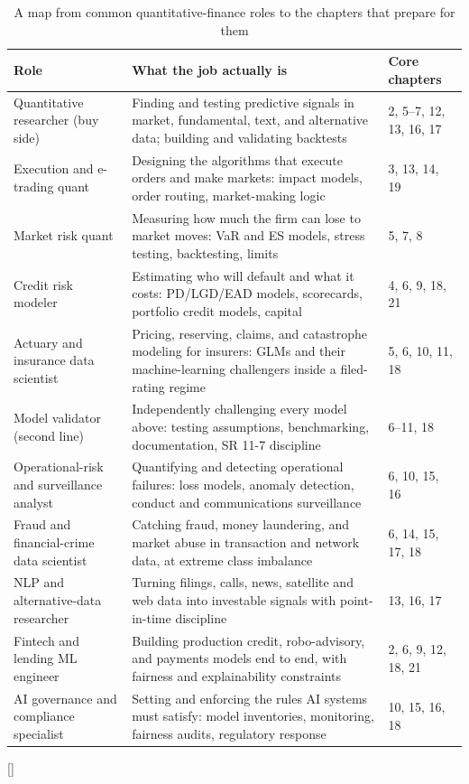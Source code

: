 \documentclass[../ai_in_finance]{subfiles}
\begin{document}
\begin{table}[htbp]
\centering
\begin{lrbox}{\bookmeasuredbox}
\begin{tabular}{L{3.4cm}L{5.6cm}L{3.4cm}}
\toprule
Role & What the job actually is & Core chapters \\
\midrule
Quantitative researcher (buy side) & Finding and testing predictive signals in market, fundamental, text, and alternative data; building and validating backtests & 2, 5--7, 12, 13, 16, 17 \\
Execution and e-trading quant & Designing the algorithms that execute orders and make markets: impact models, order routing, market-making logic & 3, 13, 14, 19 \\
Market risk quant & Measuring how much the firm can lose to market moves: VaR and ES models, stress testing, backtesting, limits & 5, 7, 8 \\
Credit risk modeler & Estimating who will default and what it costs: PD/LGD/EAD models, scorecards, portfolio credit models, capital & 4, 6, 9, 18, 21 \\
Actuary and insurance data scientist & Pricing, reserving, claims, and catastrophe modeling for insurers: GLMs and their machine-learning challengers inside a filed-rating regime & 5, 6, 10, 11, 18 \\
Model validator (second line) & Independently challenging every model above: testing assumptions, benchmarking, documentation, SR 11-7 discipline & 6--11, 18 \\
Operational-risk and surveillance analyst & Quantifying and detecting operational failures: loss models, anomaly detection, conduct and communications surveillance & 6, 10, 15, 16 \\
Fraud and financial-crime data scientist & Catching fraud, money laundering, and market abuse in transaction and network data, at extreme class imbalance & 6, 14, 15, 17, 18 \\
NLP and alternative-data researcher & Turning filings, calls, news, satellite and web data into investable signals with point-in-time discipline & 13, 16, 17 \\
Fintech and lending ML engineer & Building production credit, robo-advisory, and payments models end to end, with fairness and explainability constraints & 2, 6, 9, 12, 18, 21 \\
AI governance and compliance specialist & Setting and enforcing the rules AI systems must satisfy: model inventories, monitoring, fairness audits, regulatory response & 10, 15, 16, 18 \\
\bottomrule
\end{tabular}
\end{lrbox}
\ifdim\wd\bookmeasuredbox<0.65\linewidth
\setlength{\bookcapwidth}{0.65\linewidth}
\else
\setlength{\bookcapwidth}{\wd\bookmeasuredbox}
\fi
{}[\bookcapwidth]{
\usebox{\bookmeasuredbox}
}{
\caption{A map from common quantitative-finance roles to the chapters that prepare for them}
\label{tab:appendix-careers}
}
\end{table}
\end{document}
